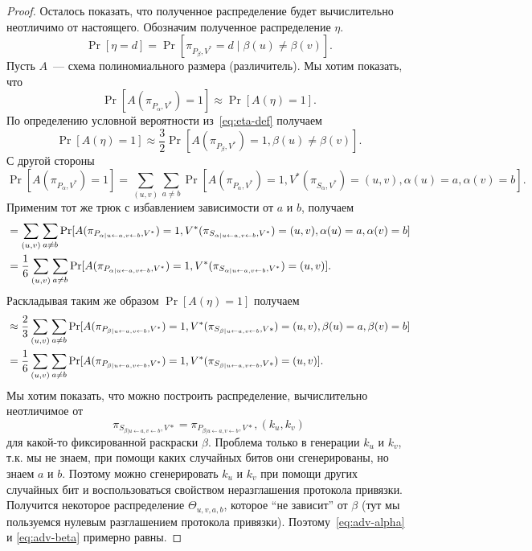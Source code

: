 \documentclass[12pt,a4paper]{article}
\theoremstyle{definition}
\theoremstyle{plain}
\theoremstyle{remark}
\begin{document}
\begin{proof}
Осталось показать, что полученное распределение будет вычислительно неотличимо от настоящего.
Обозначим полученное распределение $\eta$.
\begin{equation}\label{eq:eta-def}
\Pr[\eta = d] = \Pr[\pi_{P_{\beta}, V^*} = d\mid 
\beta(u)\neq \beta(v)].
\end{equation}
Пусть $A$~--- схема полиномиального размера (различитель).
Мы хотим показать, что $$\Pr[A(\pi_{P_\alpha, V^*}) = 1] \approx \Pr[A(\eta) = 1].$$
По определению условной вероятности из~\eqref{eq:eta-def} получаем
$$\Pr[A(\eta) = 1]\approx \frac32 \Pr[A(\pi_{P_{\beta}, V^*}) = 1, \beta(u)\neq \beta(v)].$$
С другой стороны
$$
\Pr[A(\pi_{P_\alpha, V^*}) = 1] = \sum_{(u,v)} \sum_{a\neq b} 
\Pr[A(\pi_{P_\alpha, V^*}) = 1, V^*(\pi_{S_\alpha, V^*}) = (u,v), \alpha(u) = a, \alpha(v) = b].
$$
Применим тот же трюк с избавлением зависимости от $a$ и $b$, получаем
\begin{align}\label{eq:adv-alpha}
&= \sum_{(u,v)} \sum_{a\neq b} 
\Pr[A(\pi_{P_{\alpha|u\gets a, v\gets b}, V^*}) = 1, V^*(\pi_{S_{\alpha|u\gets a, v\gets b}, V^*}) = (u,v), \alpha(u) = a, \alpha(v) = b] \notag\\ 
&= \frac{1}{6}\sum_{(u,v)} \sum_{a\neq b} 
\Pr[A(\pi_{P_{\alpha|u\gets a, v\gets b}, V^*}) = 1, V^*(\pi_{S_{\alpha|u\gets a, v\gets b}, V^*}) = (u,v)].
\end{align}
Раскладывая таким же образом $\Pr[A(\eta) = 1]$ получаем
\begin{align}\label{eq:adv-beta}
&\approx \frac{2}{3} \sum_{(u,v)} \sum_{a\neq b} 
\Pr[A(\pi_{P_{\beta|u\gets a, v\gets b}, V^*}) = 1,
 V^*(\pi_{S_{\beta|u\gets a, v\gets b}, V*}) = (u,v), \beta(u) = a, \beta(v) = b] \notag\\
&=\frac{1}{6} \sum_{(u,v)} \sum_{a\neq b} 
\Pr[A(\pi_{P_{\beta|u\gets a, v\gets b}, V^*}) = 1,
 V^*(\pi_{S_{\beta|u\gets a, v\gets b}, V*}) = (u,v)].
\end{align}
Мы хотим показать, что можно построить распределение, вычислительно неотличимое от 
$$\pi_{S_{\beta|u\gets a, v\gets b}, V*} = \pi_{P_{\beta|u\gets a, v\gets b}, V*}, (k_u, k_v)$$
для какой-то фиксированной раскраски $\beta$. Проблема только в генерации $k_u$ и $k_v$, т.к. мы не знаем, при помощи каких случайных битов они сгенерированы, но знаем $a$ и $b$. Поэтому можно сгенерировать $k_u$ и $k_v$ при помощи других случайных бит и воспользоваться свойством неразглашения протокола привязки. Получится некоторое распределение $\Theta_{u,v,a,b}$, которое ``не зависит'' от $\beta$ (тут мы пользуемся нулевым разглашением протокола привязки). Поэтому~\eqref{eq:adv-alpha} и
\eqref{eq:adv-beta} примерно равны.
\end{proof}
\end{document}
